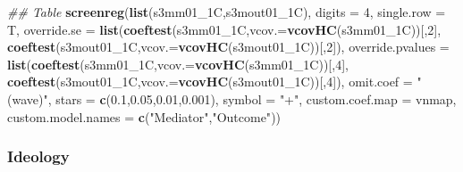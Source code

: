 \documentclass[
]{article}
\newenvironment{Shaded}{\begin{snugshade}}{\end{snugshade}}
\newcommand{\CommentTok}[1]{\textcolor[rgb]{0.56,0.35,0.01}{\textit{#1}}}
\newcommand{\DataTypeTok}[1]{\textcolor[rgb]{0.13,0.29,0.53}{#1}}
\newcommand{\DecValTok}[1]{\textcolor[rgb]{0.00,0.00,0.81}{#1}}
\newcommand{\FloatTok}[1]{\textcolor[rgb]{0.00,0.00,0.81}{#1}}
\newcommand{\KeywordTok}[1]{\textcolor[rgb]{0.13,0.29,0.53}{\textbf{#1}}}
\newcommand{\NormalTok}[1]{#1}
\newcommand{\StringTok}[1]{\textcolor[rgb]{0.31,0.60,0.02}{#1}}
\begin{document}
\begin{Shaded}
\begin{Highlighting}[]
\CommentTok{## Table}
\KeywordTok{screenreg}\NormalTok{(}\KeywordTok{list}\NormalTok{(s3mm01_1C,s3mout01_1C), }\DataTypeTok{digits =} \DecValTok{4}\NormalTok{, }\DataTypeTok{single.row =}\NormalTok{ T,}
          \DataTypeTok{override.se =} \KeywordTok{list}\NormalTok{(}\KeywordTok{coeftest}\NormalTok{(s3mm01_1C,}\DataTypeTok{vcov.=}\KeywordTok{vcovHC}\NormalTok{(s3mm01_1C))[,}\DecValTok{2}\NormalTok{],}
                             \KeywordTok{coeftest}\NormalTok{(s3mout01_1C,}\DataTypeTok{vcov.=}\KeywordTok{vcovHC}\NormalTok{(s3mout01_1C))[,}\DecValTok{2}\NormalTok{]),}
          \DataTypeTok{override.pvalues =} \KeywordTok{list}\NormalTok{(}\KeywordTok{coeftest}\NormalTok{(s3mm01_1C,}\DataTypeTok{vcov.=}\KeywordTok{vcovHC}\NormalTok{(s3mm01_1C))[,}\DecValTok{4}\NormalTok{],}
                                  \KeywordTok{coeftest}\NormalTok{(s3mout01_1C,}\DataTypeTok{vcov.=}\KeywordTok{vcovHC}\NormalTok{(s3mout01_1C))[,}\DecValTok{4}\NormalTok{]),}
          \DataTypeTok{omit.coef =} \StringTok{"(wave)"}\NormalTok{, }\DataTypeTok{stars =} \KeywordTok{c}\NormalTok{(}\FloatTok{0.1}\NormalTok{,}\FloatTok{0.05}\NormalTok{,}\FloatTok{0.01}\NormalTok{,}\FloatTok{0.001}\NormalTok{), }\DataTypeTok{symbol =} \StringTok{"+"}\NormalTok{,}
          \DataTypeTok{custom.coef.map =}\NormalTok{ vnmap, }
          \DataTypeTok{custom.model.names =} \KeywordTok{c}\NormalTok{(}\StringTok{"Mediator"}\NormalTok{,}\StringTok{"Outcome"}\NormalTok{))}
\end{Highlighting}
\end{Shaded}

\hypertarget{ideology}{%
\subsubsection{Ideology}\label{ideology}}
\end{document}
